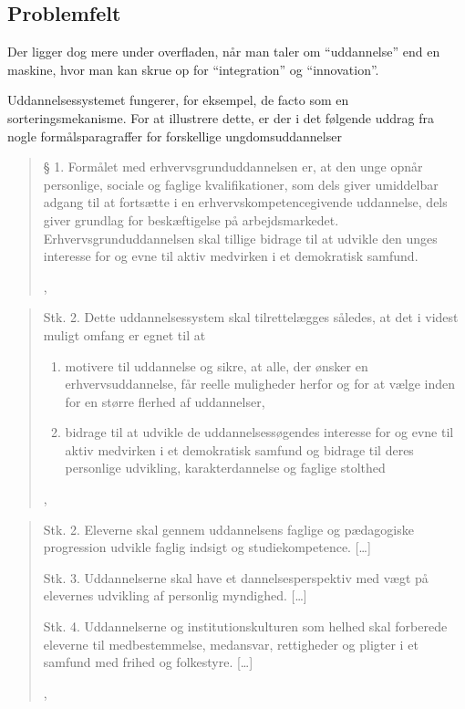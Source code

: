 \subsection{Problemfelt}\label{sec:problem}
Der ligger dog mere under overfladen, når man taler om “uddannelse” end en maskine, hvor man kan skrue op for “integration” og “innovation”.

Uddannelsessystemet fungerer, for eksempel, de facto som en sorteringsmekanisme.
For at illustrere dette, er der i det følgende uddrag fra nogle formålsparagraffer for forskellige ungdomsuddannelser 

\blockquote[,  \cite{uddannelsesministerietBekendtgorelseAfLov2016a}]{
§ 1. Formålet med erhvervsgrunduddannelsen er, at den unge opnår personlige, sociale og faglige kvalifikationer, som dels giver umiddelbar adgang til at fortsætte i en erhvervskompetencegivende uddannelse, dels giver grundlag for beskæftigelse på arbejdsmarkedet. 
Erhvervsgrunduddannelsen skal tillige bidrage til at udvikle den unges interesse for og evne til aktiv medvirken i et demokratisk samfund.
}
\blockquote[,  \cite{uddannelsesministerietBekendtgorelseAfLov2020}]{
Stk. 2. Dette uddannelsessystem skal tilrettelægges således, at det i videst muligt omfang er egnet til at
\begin{enumerate}
  \item
    motivere til uddannelse og sikre, at alle, der ønsker en erhvervsuddannelse, får reelle muligheder herfor og for at vælge inden for en større flerhed af uddannelser,

  \textins[\ldots]

  \item
    bidrage til at udvikle de uddannelsessøgendes interesse for og evne til aktiv medvirken i et demokratisk samfund og bidrage til deres personlige udvikling, karakterdannelse og faglige stolthed
    \textins[\ldots]
\end{enumerate}
}
\blockquote[, \cite{uddannelsesministerietBekendtgorelseAfLov2019}]{

  Stk. 2. Eleverne skal gennem uddannelsens faglige og pædagogiske progression udvikle faglig indsigt og studiekompetence. [\ldots]

  Stk. 3. Uddannelserne skal have et dannelsesperspektiv med vægt på elevernes udvikling af personlig myndighed. [\ldots]

  Stk. 4. Uddannelserne og institutionskulturen som helhed skal forberede eleverne til medbestemmelse, medansvar, rettigheder og pligter i et samfund med frihed og folkestyre. [\ldots]
}

